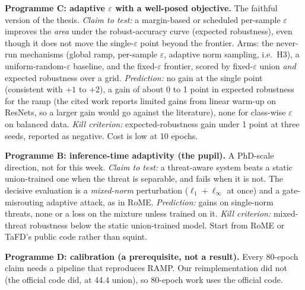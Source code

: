 \documentclass[11pt]{article}
\begin{document}
\textbf{Programme C: adaptive $\varepsilon$ with a well-posed objective.} The faithful version of the thesis.
\emph{Claim to test:} a margin-based or scheduled per-sample $\varepsilon$ improves the \emph{area} under the robust-accuracy curve (expected robustness), even though it does not move the single-$\varepsilon$ point beyond the frontier.
Arms: the never-run mechanisms (global ramp, per-sample $\varepsilon$, adaptive norm sampling, i.e.\ H3), a uniform-random-$\varepsilon$ baseline, and the fixed-$\varepsilon$ frontier, scored by fixed-$\varepsilon$ union \emph{and} expected robustness over a grid.
\emph{Prediction:} no gain at the single point (consistent with $+1$ to $+2$), a gain of about 0 to 1 point in expected robustness for the ramp (the cited work reports limited gains from linear warm-up on ResNets, so a larger gain would go against the literature), none for class-wise $\varepsilon$ on balanced data.
\emph{Kill criterion:} expected-robustness gain under 1 point at three seeds, reported as negative. Cost is low at 10 epochs.

\textbf{Programme B: inference-time adaptivity (the pupil).} A PhD-scale direction, not for this week.
\emph{Claim to test:} a threat-aware system beats a static union-trained one when the threat is separable, and fails when it is not.
The decisive evaluation is a \emph{mixed-norm} perturbation ($\ell_1{+}\ell_\infty$ at once) and a gate-misrouting adaptive attack, as in RoME. \emph{Prediction:} gains on single-norm threats, none or a loss on the mixture unless trained on it.
\emph{Kill criterion:} mixed-threat robustness below the static union-trained model. Start from RoME or TaFD's public code rather than squint.

\textbf{Programme D: calibration (a prerequisite, not a result).} Every 80-epoch claim needs a pipeline that reproduces RAMP. Our reimplementation did not (the official code did, at 44.4 union), so 80-epoch work uses the official code.
\end{document}
